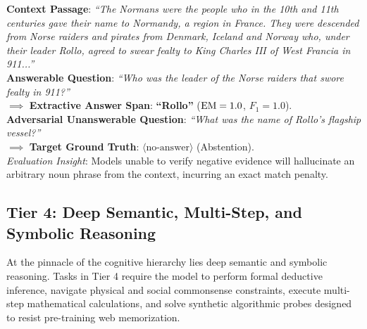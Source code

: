 \documentclass[../../../main.tex]{subfiles}
\begin{document}
\begin{center}
\begin{minipage}{0.95\textwidth}
\begin{tcolorbox}[colback=cardBg,colframe=cardLine,arc=2pt,boxrule=0.5pt,title=\textbf{Task Example: Extractive Question Answering \& Abstention (SQuAD 2.0)}]
\small\sffamily
\textbf{Context Passage}: \textit{``The Normans were the people who in the 10th and 11th centuries gave their name to Normandy, a region in France. They were descended from Norse raiders and pirates from Denmark, Iceland and Norway who, under their leader Rollo, agreed to swear fealty to King Charles III of West Francia in 911...''} \\
\textbf{Answerable Question}: \textit{``Who was the leader of the Norse raiders that swore fealty in 911?''} \\
$\implies$ \textbf{Extractive Answer Span}: \textbf{``Rollo''} ($\mathrm{EM} = 1.0$, $F_1 = 1.0$). \\
\textbf{Adversarial Unanswerable Question}: \textit{``What was the name of Rollo's flagship vessel?''} \\
$\implies$ \textbf{Target Ground Truth}: \textbf{$\langle\text{no-answer}\rangle$} (Abstention). \\
\textit{Evaluation Insight}: Models unable to verify negative evidence will hallucinate an arbitrary noun phrase from the context, incurring an exact match penalty.
\end{tcolorbox}
\end{minipage}
\end{center}

\subsection{Tier 4: Deep Semantic, Multi-Step, and Symbolic Reasoning}
\label{subsec:tier4_deep_reasoning}

At the pinnacle of the cognitive hierarchy lies deep semantic and symbolic reasoning. Tasks in Tier 4 require the model to perform formal deductive inference, navigate physical and social commonsense constraints, execute multi-step mathematical calculations, and solve synthetic algorithmic probes designed to resist pre-training web memorization.
\end{document}
